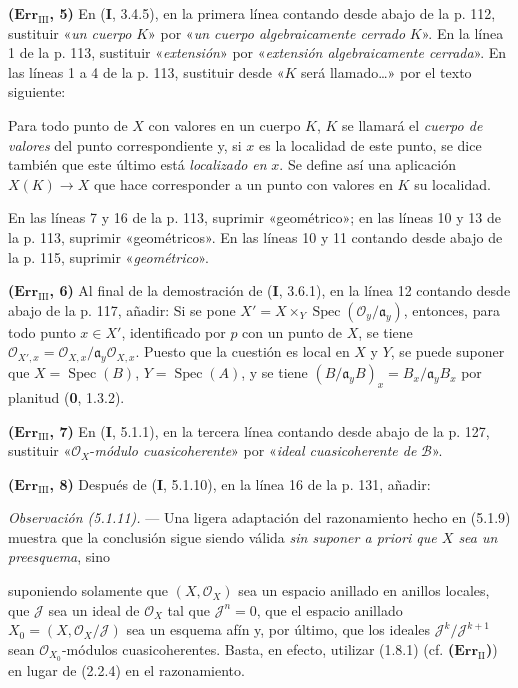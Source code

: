 \noindent\textbf{($\mathbf{Err}_{\mathrm{III}}$, 5)} En (\textbf I, 3.4.5), en la
primera línea contando desde abajo de la p. 112, sustituir «\emph{un cuerpo}
$K$» por «\emph{un cuerpo algebraicamente cerrado} $K$». En la línea 1 de la
p. 113, sustituir «\emph{extensión}» por «\emph{extensión algebraicamente
cerrada}». En las líneas 1 a 4 de la p. 113, sustituir desde «$K$ será
llamado\ldots{}» por el texto siguiente:

Para todo punto de $X$ con valores en un cuerpo $K$, $K$ se llamará el
\emph{cuerpo de valores} del punto correspondiente y, si $x$ es la localidad
de este punto, se dice también que este último está \emph{localizado en} $x$.
Se define así una aplicación $X(K)\to X$ que hace corresponder a un punto con
valores en $K$ su localidad.

En las líneas 7 y 16 de la p. 113, suprimir «geométrico»; en las líneas 10 y 13
de la p. 113, suprimir «geométricos». En las líneas 10 y 11 contando desde
abajo de la p. 115, suprimir «\emph{geométrico}».

\noindent\textbf{($\mathbf{Err}_{\mathrm{III}}$, 6)} Al final de la
demostración de (\textbf I, 3.6.1), en la línea 12 contando desde abajo de la p. 117,
añadir: Si se pone
$X'=X\times_Y\operatorname{Spec}(\mathscr O_y/\mathfrak a_y)$, entonces, para
todo punto $x\in X'$, identificado por $p$ con un punto de $X$, se tiene
$\mathscr O_{X',x}=\mathscr O_{X,x}/\mathfrak a_y\mathscr O_{X,x}$. Puesto que
la cuestión es local en $X$ y $Y$, se puede suponer que
$X=\operatorname{Spec}(B)$, $Y=\operatorname{Spec}(A)$, y se tiene
$(B/\mathfrak a_yB)_x=B_x/\mathfrak a_yB_x$ por planitud (\textbf{0}, 1.3.2).

\noindent\textbf{($\mathbf{Err}_{\mathrm{III}}$, 7)} En (\textbf I, 5.1.1), en la
tercera línea contando desde abajo de la p. 127, sustituir
«$\mathscr O_X$-\emph{módulo cuasicoherente}» por «\emph{ideal cuasicoherente de}
$\mathscr B$».

\noindent\textbf{($\mathbf{Err}_{\mathrm{III}}$, 8)} Después de (\textbf I, 5.1.10),
en la línea 16 de la p. 131, añadir:

\emph{Observación (5.1.11).} --- Una ligera adaptación del razonamiento hecho
en (5.1.9) muestra que la conclusión sigue siendo válida \emph{sin suponer a
priori que $X$ sea un preesquema}, sino

suponiendo solamente que $(X,\mathscr O_X)$ sea un espacio anillado en anillos
locales, que $\mathscr J$ sea un ideal de $\mathscr O_X$ tal que
$\mathscr J^n=0$, que el espacio anillado
$X_0=(X,\mathscr O_X/\mathscr J)$ sea un esquema afín y, por último, que los
ideales $\mathscr J^k/\mathscr J^{k+1}$ sean $\mathscr O_{X_0}$-módulos
cuasicoherentes. Basta, en efecto, utilizar (1.8.1) (cf.
\textbf{($\mathbf{Err}_{\mathrm{II}}$)}) en lugar de (2.2.4) en el razonamiento.

